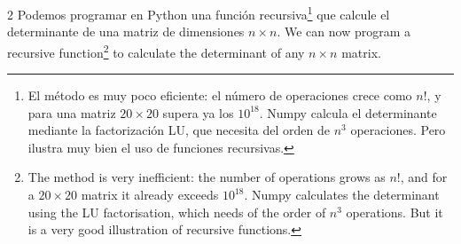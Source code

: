 \begin{paracol}{2}
Podemos programar en Python una función recursiva\footnote{El método es muy poco eficiente: el número de operaciones crece como $n!$, y para una matriz $20\times 20$ supera ya los $10^{18}$. Numpy calcula el determinante mediante la factorización LU, que necesita del orden de $n^3$ operaciones. Pero ilustra muy bien el uso de funciones recursivas.} que calcule el determinante de una matriz de dimensiones $n\times n$.
\switchcolumn
We can now program a recursive function\footnote{The method is very inefficient: the number of operations grows as $n!$, and for a $20\times 20$ matrix it already exceeds $10^{18}$. Numpy calculates the determinant using the LU factorisation, which needs of the order of $n^3$ operations. But it is a very good illustration of recursive functions.} to calculate the determinant of any $n\times n$ matrix.
\end{paracol}

